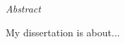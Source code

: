 \thispagestyle{plain}
\begin{center}
    \LARGE{\emph{Abstract}}
\end{center}
\vspace{1cm}
My dissertation is about...